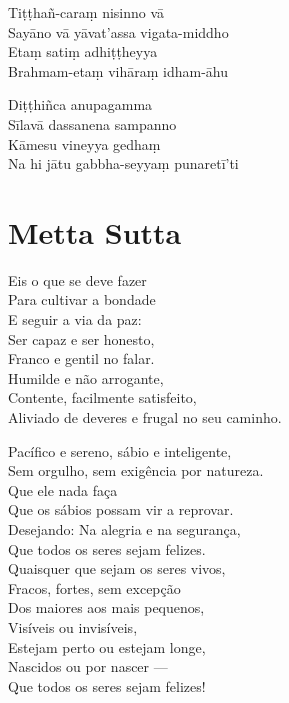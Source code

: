 \documentclass[
  babelLanguage=english,
  final,
  webversion,
]{chantingbook}
\begin{document}
Tiṭṭhañ-caraṃ nisinno vā\\
Sayāno vā yāvat'assa vigata-middho\\
Etaṃ satiṃ adhiṭṭheyya\\
Brahmam-etaṃ vihāraṃ idham-āhu

Diṭṭhiñca anupagamma\\
Sīlavā dassanena sampanno\\
Kāmesu vineyya gedhaṃ\\
Na hi jātu gabbha-seyyaṃ punaretī'ti

\chapter[Metta Sutta]{Metta Sutta}


\begin{leader}
\end{leader}

Eis o que se deve fazer\\
Para cultivar a bondade\\
E seguir a via da paz:\\
Ser capaz e ser honesto,\\
Franco e gentil no falar.\\
Humilde e não arrogante,\\
Contente, facilmente satisfeito,\\
Aliviado de deveres e frugal no seu caminho.

Pacífico e sereno, sábio e inteligente,\\
Sem orgulho, sem exigência por natureza.\\
Que ele nada faça\\
Que os sábios possam vir a reprovar.\\
Desejando: Na alegria e na segurança,\\
Que todos os seres sejam felizes.\\
Quaisquer que sejam os seres vivos,\\
Fracos, fortes, sem excepção\\
Dos maiores aos mais pequenos,\\
Visíveis ou invisíveis,\\
Estejam perto ou estejam longe,\\
Nascidos ou por nascer ---\\
Que todos os seres sejam felizes!
\end{document}

